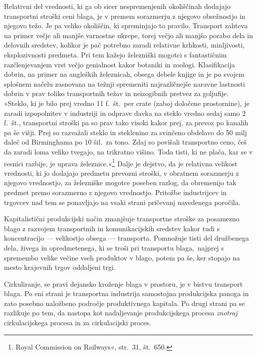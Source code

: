 \documentclass[kapital_02.tex]{subfiles}
\begin{document}
Relativni del vrednosti, ki ga ob sicer nespremenjenih okoliščinah dodajajo transportni stroški ceni blaga, je v premem sorazmerju z njegovo obsežnostjo in njegovo težo.
Je pa veliko okoliščin, ki spreminjajo to pravilo.
Transport zahteva na primer večje ali manjše varnostne ukrepe, torej večjo ali manjšo porabo dela in delovnih sredstev, kolikor je pač potrebno zaradi relativne krhkosti, minljivosti, eksplozivnosti predmeta.
Pri tem kažejo železniški mogotci s fantastičnim razčlenjevanjem vrst večjo genialnost kakor botaniki in zoologi.
Klasifikacija dobrin, na primer na angleških železnicah, obsega debele knjige in je po svojem splošnem načelu zasnovana na težnji spremeniti najrazličnejše naravne lastnosti dobrin v prav toliko transportnih težav in neizogibnih pretvez za goljufije.
»Steklo, ki je bilo prej vredno 11 f.\ št.\ per crate (zaboj določene prostornine), je zaradi izpopolnitev v industriji in odprave davka na steklo vredno sedaj samo 2 f.\ št., transportni stroški pa so prav tako visoki kakor prej, za prevoz po kanalih pa še višji.
Prej so razvažali steklo in steklenino za svinčeno obdelavo do 50 milj daleč od Birminghama po 10 šil.\ za tono.
Zdaj so povišali transportno ceno, češ da zaradi loma veliko tvegajo, na trikratno višino. 
Toda tisti, ki ne plača, kar se v resnici razbije, je uprava železnice.«\footnote
{Royal Commission on Railways«, str.\ 31, št.\ 650.}
Dalje je dejstvo, da je relativna velikost vrednosti, ki jo dodajajo predmetu prevozni stroški, v obratnem sorazmerju z njegovo vrednostjo, za železniške mogotce poseben razlog, da obremenijo tak predmet premo sorazmerno z njegovo vrednostjo. 
Pritožbe industrijcev in trgovcev nad tem se ponavljajo na vsaki strani pričevanj navedenega poročila.

Kapitalistični produkcijski način zmanjšuje transportne stroške za posamezno blago z razvojem transportnih in komunikacijskih sredstev kakor tudi s koncentracijo — velikostjo obsega — transporta.
Pomnožuje tisti del družbenega dela, živega in opredmetenega, ki se troši pri transportu blaga,\KPEstran\ najprej s spremembo velike večine vseh produktov v blago, potem pa še, ker stopajo na mesto krajevnih trgov oddaljeni trgi.

Cirkuliranje, se pravi dejansko kroženje blaga v prostoru, je v bistvu transport blaga.
Po eni strani je transportna industrija samostojna produkcijska panoga in zato posebno naložbeno področje produktivnega kapitala.
Po drugi strani pa se razlikuje po tem, da nastopa kot nadaljevanje produkcijskega procesa \emph{znotraj} cirkulacijskega procesa in za cirkulacijski proces.
\end{document}
